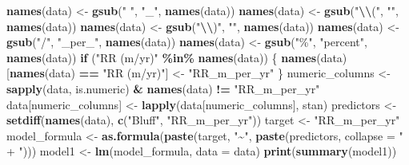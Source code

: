\documentclass[
]{article}
\newenvironment{Shaded}{\begin{snugshade}}{\end{snugshade}}
\newcommand{\AttributeTok}[1]{\textcolor[rgb]{0.13,0.29,0.53}{#1}}
\newcommand{\ControlFlowTok}[1]{\textcolor[rgb]{0.13,0.29,0.53}{\textbf{#1}}}
\newcommand{\FunctionTok}[1]{\textcolor[rgb]{0.13,0.29,0.53}{\textbf{#1}}}
\newcommand{\NormalTok}[1]{#1}
\newcommand{\OtherTok}[1]{\textcolor[rgb]{0.56,0.35,0.01}{#1}}
\newcommand{\SpecialCharTok}[1]{\textcolor[rgb]{0.81,0.36,0.00}{\textbf{#1}}}
\newcommand{\StringTok}[1]{\textcolor[rgb]{0.31,0.60,0.02}{#1}}
\begin{document}
\begin{Shaded}
\begin{Highlighting}[]
\FunctionTok{names}\NormalTok{(data) }\OtherTok{\textless{}{-}} \FunctionTok{gsub}\NormalTok{(}\StringTok{" "}\NormalTok{, }\StringTok{"\_"}\NormalTok{, }\FunctionTok{names}\NormalTok{(data))}
\FunctionTok{names}\NormalTok{(data) }\OtherTok{\textless{}{-}} \FunctionTok{gsub}\NormalTok{(}\StringTok{"}\SpecialCharTok{\textbackslash{}\textbackslash{}}\StringTok{("}\NormalTok{, }\StringTok{""}\NormalTok{, }\FunctionTok{names}\NormalTok{(data))}
\FunctionTok{names}\NormalTok{(data) }\OtherTok{\textless{}{-}} \FunctionTok{gsub}\NormalTok{(}\StringTok{"}\SpecialCharTok{\textbackslash{}\textbackslash{}}\StringTok{)"}\NormalTok{, }\StringTok{""}\NormalTok{, }\FunctionTok{names}\NormalTok{(data))}
\FunctionTok{names}\NormalTok{(data) }\OtherTok{\textless{}{-}} \FunctionTok{gsub}\NormalTok{(}\StringTok{"/"}\NormalTok{, }\StringTok{"\_per\_"}\NormalTok{, }\FunctionTok{names}\NormalTok{(data))}
\FunctionTok{names}\NormalTok{(data) }\OtherTok{\textless{}{-}} \FunctionTok{gsub}\NormalTok{(}\StringTok{"\%"}\NormalTok{, }\StringTok{"percent"}\NormalTok{, }\FunctionTok{names}\NormalTok{(data))}
\ControlFlowTok{if}\NormalTok{ (}\StringTok{"RR (m/yr)"} \SpecialCharTok{\%in\%} \FunctionTok{names}\NormalTok{(data)) \{}
  \FunctionTok{names}\NormalTok{(data)[}\FunctionTok{names}\NormalTok{(data) }\SpecialCharTok{==} \StringTok{"RR (m/yr)"}\NormalTok{] }\OtherTok{\textless{}{-}} \StringTok{"RR\_m\_per\_yr"}
\NormalTok{\}}
\NormalTok{numeric\_columns }\OtherTok{\textless{}{-}} \FunctionTok{sapply}\NormalTok{(data, is.numeric) }\SpecialCharTok{\&} \FunctionTok{names}\NormalTok{(data) }\SpecialCharTok{!=} \StringTok{"RR\_m\_per\_yr"}
\NormalTok{data[numeric\_columns] }\OtherTok{\textless{}{-}} \FunctionTok{lapply}\NormalTok{(data[numeric\_columns], stan)}
\NormalTok{predictors }\OtherTok{\textless{}{-}} \FunctionTok{setdiff}\NormalTok{(}\FunctionTok{names}\NormalTok{(data), }\FunctionTok{c}\NormalTok{(}\StringTok{"Bluff"}\NormalTok{, }\StringTok{"RR\_m\_per\_yr"}\NormalTok{))}
\NormalTok{target }\OtherTok{\textless{}{-}} \StringTok{"RR\_m\_per\_yr"}
\NormalTok{model\_formula }\OtherTok{\textless{}{-}} \FunctionTok{as.formula}\NormalTok{(}\FunctionTok{paste}\NormalTok{(target, }\StringTok{"\textasciitilde{}"}\NormalTok{, }\FunctionTok{paste}\NormalTok{(predictors, }\AttributeTok{collapse =} \StringTok{" + "}\NormalTok{)))}
\NormalTok{model1 }\OtherTok{\textless{}{-}} \FunctionTok{lm}\NormalTok{(model\_formula, }\AttributeTok{data =}\NormalTok{ data)}
\FunctionTok{print}\NormalTok{(}\FunctionTok{summary}\NormalTok{(model1))}
\end{Highlighting}
\end{Shaded}
\end{document}
